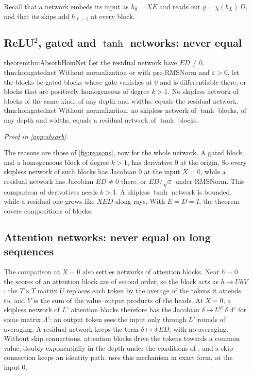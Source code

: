 \documentclass[10pt]{article}
\theoremstyle{definition}
\theoremstyle{remark}
\newcommand{\ptlabel}[1]{\phantomsection\label{#1}}
\newcommand{\proofin}[1]{\par\vspace{-0.4\baselineskip}\noindent\hfill{\small\itshape Proof in \cref{#1}.}\par\smallskip}
\newcommand{\stpart}[3]{\ifx\relax#1\relax\else\ptlabel{#1:#2}\fi{\upshape\bfseries\boldmath(#2)\ifx\relax#3\relax\else\ #3.\fi}}
\begin{document}
Recall that a network embeds its input as $h_0 = XE$ and reads out $y = \chi(h_L)\,D$, and that its skips add $h_{\ell-1}$ at every block.

\subsection{ReLU\texorpdfstring{$^2$}{2}, gated and \texorpdfstring{$\tanh$}{tanh} networks: never equal}\label{sec:nevernets}

\begin{restatable}{theorem}{thmAbsorbHomNet}\label{thm:homgatednet}
Let the residual network have $ED \neq 0$.\\
\stpart{thm:homgatednet}{i}{} Without normalization or with pre-RMSNorm and $\varepsilon > 0$, let the blocks be gated blocks whose gate vanishes at $0$ and is differentiable there, or blocks that are positively homogeneous of degree $k > 1$. No skipless network of blocks of the same kind, of any depth and widths, equals the residual network.\\
\stpart{thm:homgatednet}{ii}{} Without normalization, no skipless network of $\tanh$ blocks, of any depth and widths, equals a residual network of $\tanh$ blocks.
\end{restatable}
\proofin{app:absorb}

The reasons are those of \cref{fig:reasons}, now for the whole network. A gated block, and a homogeneous block of degree $k > 1$, has derivative $0$ at the origin. So every skipless network of such blocks has Jacobian $0$ at the input $X = 0$, while a residual network has Jacobian $ED \neq 0$ there, or $ED/\sqrt{\varepsilon}$ under RMSNorm. This comparison of derivatives needs $k > 1$. A skipless $\tanh$ network is bounded, while a residual one grows like $XED$ along rays. With $E = D = I$, the theorem covers compositions of blocks.

\subsection{Attention networks: never equal on long sequences}\label{sec:attnnets}

The comparison at $X = 0$ also settles networks of attention blocks. Near $h = 0$ the scores of an attention block are of second order, so the block acts as $h \mapsto UhV$: the $T\times T$ matrix $U$ replaces each token by the average of the tokens it attends to, and $V$ is the sum of the value--output products of the heads. At $X = 0$, a skipless network of $L'$ attention blocks therefore has the Jacobian $\delta \mapsto U^{L'}\delta\,\Lambda'$ for some matrix $\Lambda'$: an output token sees the input only through $L'$ rounds of averaging. A residual network keeps the term $\delta \mapsto \delta\,ED$, with no averaging. Without skip connections, attention blocks drive the tokens towards a common value, doubly exponentially in the depth under the conditions of \citet[Theorem~2.3]{dong2021rank}, and a skip connection keeps an identity path.  uses this mechanism in exact form, at the input $0$.
\end{document}
